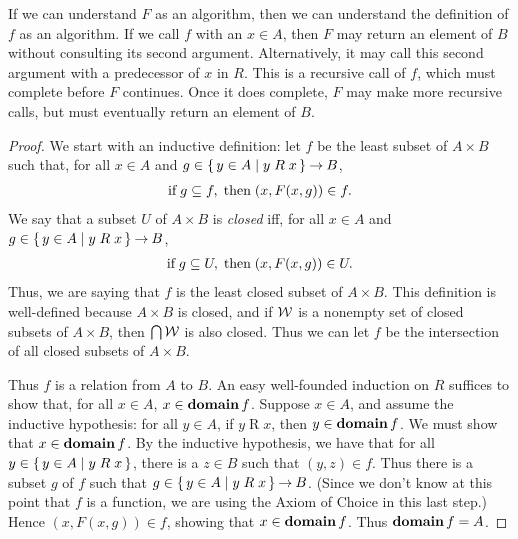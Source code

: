 If we can understand $F$ as an algorithm, then we can understand the
definition of $f$ as an algorithm.  If we call $f$ with an $x\in A$,
then $F$ may return an element of $B$ without consulting its second
argument.  Alternatively, it may call this second argument with a
predecessor of $x$ in $R$.  This is a recursive call of $f$, which must
complete before $F$ continues.  Once it does complete, $F$ may make
more recursive calls, but must eventually return an element of $B$.

\begin{proof}
We start with an inductive definition:
let $f$ be the least subset of $A\times B$ such that, for
all $x\in A$ and $g\in\{ \, y\in A \mid y\mathrel{R}x \, \}\mathbin{\to} B$,
\begin{gather*}
\allowbreak\mbox{if}\allowbreak\; g\subseteq f, \;\allowbreak\mbox{then}\allowbreak\; (x, F(x, g))\in f .
\end{gather*}
We say that a subset $U$ of $A\times B$ is \emph{closed} iff, for
all $x\in A$ and $g\in\{ \, y\in A \mid y\mathrel{R}x \, \}\mathbin{\to} B$,
\begin{gather*}
\allowbreak\mbox{if}\allowbreak\; g\subseteq U, \;\allowbreak\mbox{then}\allowbreak\; (x, F(x, g))\in U .
\end{gather*}
Thus, we are saying that $f$ is the least closed subset of
$A\times B$.
This definition is well-defined because $A\times B$ is closed,
and if $\cal W$ is a nonempty set of closed subsets
of $A\times B$, then $\bigcap\cal W$ is also closed.
Thus we can let $f$ be the intersection of
all closed subsets of $A\times B$.

Thus $f$ is a relation from $A$ to $B$.  An easy well-founded
induction on $R$ suffices to show that, for all $x\in A$,
$x\in\mathbf{domain}\,f$.  Suppose $x\in A$, and assume the inductive
hypothesis: for all $y\in A$, if $y\mathrel{R}x$, then $y\in\mathbf{domain}\,f$.
We must show that $x\in\mathbf{domain}\,f$.  By the inductive hypothesis,
we have that for all $y\in\{ \, y\in A \mid y\mathrel{R}x \, \}$,
there is a $z\in B$ such that $(y,z)\in f$.  Thus there
is a subset $g$ of $f$ such that $g\in\{ \, y\in A \mid y\mathrel{R}x \, \}\mathbin{\to} B$.
(Since we don't know at this point that $f$ is a function, we
are using the Axiom of Choice in this last step.)
Hence $(x,F(x,g))\in f$, showing that $x\in\mathbf{domain}\,f$.
Thus $\mathbf{domain}\,f=A$.


\end{proof}
